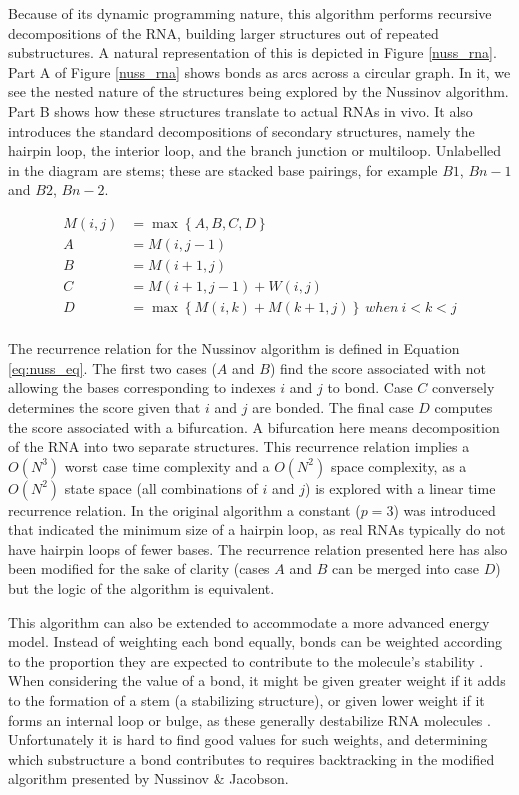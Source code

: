 \documentclass{cshonours}
\begin{document}
Because of its dynamic programming
nature, this algorithm performs recursive decompositions of the RNA, building
larger structures out of repeated substructures. A natural representation of this is
depicted in Figure \ref{nuss_rna}. Part A of Figure \ref{nuss_rna} shows bonds as arcs across a circular
graph. In it, we see the nested nature of the structures being explored by the
Nussinov algorithm. Part B shows how these structures translate to actual RNAs in vivo. It also introduces the standard decompositions
of secondary structures, namely the hairpin loop, the interior loop, and the branch
junction or multiloop. Unlabelled in the diagram are stems; these are stacked
base pairings, for example $B1$, $Bn - 1$ and $B2$, $Bn - 2$.

\begin{align} \label{eq:nuss_eq}
	M(i, j) &= \max \left\lbrace A, B, C, D \right\rbrace \nonumber  \\
	A &= M(i, j-1) \nonumber \\
	B &= M(i+1, j) \nonumber \\
	C &= M(i+1, j-1) + W(i, j) \nonumber \\
	D &= \max \left\lbrace M(i, k) + M(k+1, j) \right\rbrace \: when \: i < k < j \nonumber	\\
\end{align}



The recurrence relation for the Nussinov algorithm is defined in Equation \ref{eq:nuss_eq}. The first two cases ($A$ and $B$) find the score associated with not allowing the bases corresponding to indexes $i$ and $j$ to bond. Case $C$ conversely determines the score given that $i$ and $j$ are bonded. The final case $D$ computes the score associated with a bifurcation. A bifurcation here means decomposition of the RNA into two separate structures. This recurrence relation implies a $O(N^3)$
worst case time complexity and a $O(N^2)$ space complexity, as a $O(N^2)$ state space (all combinations of $i$ and $j$) is explored
with a linear time recurrence relation. In the original algorithm a constant ($p = 3$) was introduced that indicated the minimum size of a hairpin loop, as real RNAs typically do not have hairpin loops of fewer bases. The recurrence relation presented here has also been modified for the sake of clarity (cases $A$ and $B$ can be merged into case $D$) but the logic of the algorithm is equivalent.


This algorithm can also be extended to accommodate a more advanced energy
model. Instead of weighting each bond equally, bonds can be weighted
according to the proportion they are expected to contribute to the molecule's
stability \cite{nussinov1980fast}. When considering the value of a bond, it might be given greater
weight if it adds to the formation of a stem (a stabilizing structure), or
given lower weight if it forms an internal loop or bulge, as these generally
destabilize RNA molecules \cite{nussinov1980fast}. Unfortunately it is hard to find good values for
such weights, and determining which substructure a bond contributes to requires
backtracking in the modified algorithm presented by Nussinov \& Jacobson.
\end{document}
